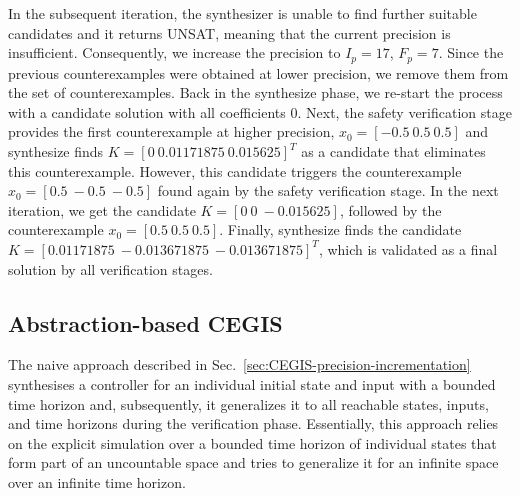 \documentclass[runningheads,a4paper]{llncs}
\begin{document}
In the subsequent iteration, the synthesizer is unable to find further 
suitable candidates and it returns UNSAT, meaning that the current precision is
insufficient.  Consequently, we increase the precision to $I_p=17$,
$F_p=7$.
%
Since the previous counterexamples were obtained at lower precision,
we remove them from the set of counterexamples.  Back in the {\sc
  synthesize} phase, we re-start the process with a candidate solution
with all coefficients $0$.  Next, the {\sc safety} verification stage
provides the first counterexample at higher precision, $x_0=[-0.5
  \ 0.5 \ 0.5]$ and {\sc synthesize} finds $K=[0 \ 0.01171875
  \ 0.015625]^T$ as a candidate that eliminates this counterexample.
However, this candidate triggers the counterexample
$x_0=[0.5\ -0.5\ -0.5]$ found again by the {\sc safety} verification
stage.  In the next iteration, we get the candidate $K=[0 \ 0
  \ -0.015625]$, followed by the counterexample $x_0 = [0.5 \ 0.5
  \ 0.5]$. Finally, {\sc synthesize} finds the candidate $K=[0.01171875
  \ -0.013671875 \ -0.013671875]^T$, which is validated as a final
solution by all verification stages.

\subsection{Abstraction-based CEGIS}
\label{sec:CEGIS-abstraction-refinement}



  The naive approach described in Sec.~\ref{sec:CEGIS-precision-incrementation}
  synthesises a controller for an individual initial state
and input with a bounded time horizon and, subsequently, it generalizes it to all reachable states,
inputs, and time horizons during the verification phase.
Essentially, this approach relies on the explicit
simulation over a bounded time horizon of individual states that form
part of an uncountable space and tries to generalize it for an
infinite space over an infinite time horizon.

\end{document}
